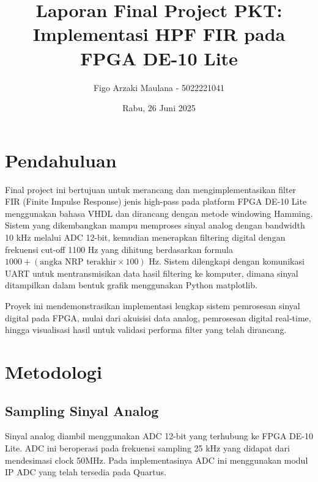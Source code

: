 \documentclass{article}
\begin{document}
\title{Laporan Final Project PKT: Implementasi HPF FIR pada FPGA DE-10 Lite}
\author{Figo Arzaki Maulana - 5022221041}
\date{Rabu, 26 Juni 2025}
\maketitle

\section{Pendahuluan}

Final project ini bertujuan untuk merancang dan mengimplementasikan filter FIR (Finite Impulse Response)
jenis high-pass pada platform FPGA DE-10 Lite menggunakan bahasa VHDL dan dirancang dengan metode windowing Hamming.
Sistem yang dikembangkan mampu memproses sinyal analog dengan bandwidth 10 kHz melalui ADC 12-bit,
kemudian menerapkan filtering digital dengan frekuensi cut-off 1100 Hz yang dihitung berdasarkan formula $1000 + (\text{angka NRP terakhir} \times 100)$ Hz.
Sistem dilengkapi dengan komunikasi UART untuk mentransmisikan data hasil filtering ke komputer,
dimana sinyal ditampilkan dalam bentuk grafik menggunakan Python matplotlib.

Proyek ini mendemonstrasikan implementasi lengkap sistem pemrosesan sinyal digital pada FPGA,
mulai dari akuisisi data analog, pemrosesan digital real-time, hingga visualisasi hasil untuk validasi
performa filter yang telah dirancang.

\section{Metodologi}

\subsection{Sampling Sinyal Analog}
Sinyal analog diambil menggunakan ADC 12-bit yang terhubung ke FPGA DE-10 Lite.
ADC ini beroperasi pada frekuensi sampling 25 kHz yang didapat dari mendesimasi clock 50MHz.
Pada implementasinya ADC ini menggunakan modul IP ADC
yang telah tersedia pada Quartus.
\end{document}
